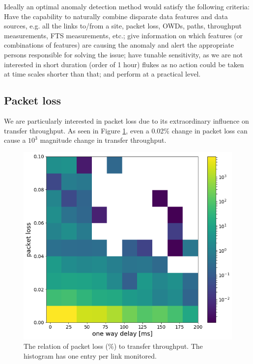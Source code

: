 \documentclass[5p]{elsarticle}
\begin{document}
Ideally an optimal anomaly detection method would satisfy the following criteria: Have the capability to naturally combine disparate data features and data sources, e.g. all the links to/from a site, packet loss, OWDs, paths, throughput measurements, FTS measurements, etc.; give information on which features (or combinations of features) are causing the anomaly and alert the appropriate persons responsible for solving the issue; have tunable sensitivity, as we are not interested in short duration (order of 1 hour) flukes as no action could be taken at time scales shorter than that; and perform at a practical level.

\subsection{Packet loss}

We are particularly interested in packet loss due to its extraordinary influence on transfer throughput. As seen in Figure \ref{fig:PL}, even a 0.02\% change in packet loss can cause a $10^3$ magnitude change in transfer throughput.

\begin{figure}[htbp]
    \centering
    \includegraphics[width=\linewidth]{PL.png}
    \caption{The relation of packet loss (\%) to transfer throughput.  The histogram has one entry per link monitored.}
    \label{fig:PL}
\end{figure}
\end{document}
